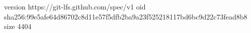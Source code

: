 version https://git-lfs.github.com/spec/v1
oid sha256:99e5afe64d86702c8d11e57f5dfb2ba9a23f525218117bd6bc9d22c73fead8b8
size 4404
